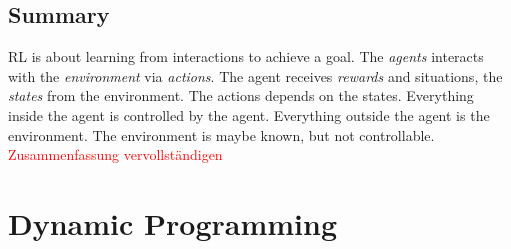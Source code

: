 \documentclass[10pt,a4paper]{article}
\begin{document}
\subsection{Summary}
RL is about learning from interactions to achieve a goal. The \textit{agents} interacts with the \textit{environment} via \textit{actions}. The agent receives \textit{rewards} and situations, the \textit{states} from the environment. The actions depends on the states. Everything inside the agent is controlled by the agent. Everything outside the agent is the environment. The environment is maybe known, but not controllable.
\textcolor{red}{Zusammenfassung vervollständigen}

\pagebreak
\section{Dynamic Programming}
\end{document}
